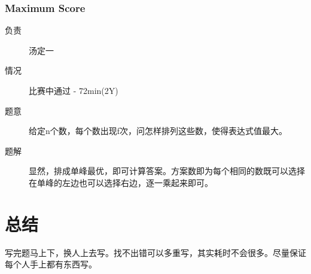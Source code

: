 \documentclass[a4paper, 11pt, nofonts, nocap, fancyhdr]{ctexart}
\newcommand{\problem}[1]{\subsubsection{#1}}
\begin{document}
\problem{Maximum Score}

\begin{description}
\item[负责] 汤定一
\item[情况] 比赛中通过 - 72min(2Y)
\item[题意]
给定n个数，每个数出现f次，问怎样排列这些数，使得表达式值最大。
\item[题解]
显然，排成单峰最优，即可计算答案。方案数即为每个相同的数既可以选择在单峰的左边也可以选择右边，逐一乘起来即可。
\end{description}

\section{总结}

写完题马上下，换人上去写。找不出错可以多重写，其实耗时不会很多。尽量保证每个人手上都有东西写。
\end{document}
